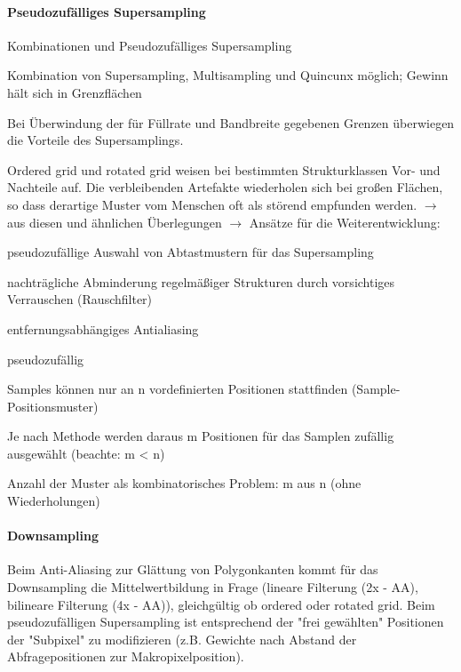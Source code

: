 \documentclass[landscape]{article}
\begin{document}
\begin{multicols}{3}
  \paragraph{Pseudozufälliges Supersampling}
  \begin{itemize*}
    \item Kombinationen und Pseudozufälliges Supersampling
          \begin{itemize*}
            \item Kombination von Supersampling, Multisampling und Quincunx möglich; Gewinn hält sich in Grenzflächen
            \item Bei Überwindung der für Füllrate und Bandbreite gegebenen Grenzen überwiegen die Vorteile des Supersamplings.
            \item Ordered grid und rotated grid weisen bei bestimmten Strukturklassen Vor- und Nachteile auf. Die verbleibenden Artefakte wiederholen sich bei großen Flächen, so dass derartige Muster vom Menschen oft als störend empfunden werden. $\rightarrow$ aus diesen und ähnlichen Überlegungen $\rightarrow$ Ansätze für die Weiterentwicklung:
            \item pseudozufällige Auswahl von Abtastmustern für das Supersampling
            \item nachträgliche Abminderung regelmäßiger Strukturen durch vorsichtiges Verrauschen (Rauschfilter)
            \item entfernungsabhängiges Antialiasing
          \end{itemize*}
    \item pseudozufällig
          \begin{itemize*}
            \item Samples können nur an n vordefinierten Positionen stattfinden (Sample-Positionsmuster)
            \item Je nach Methode werden daraus m Positionen für das Samplen zufällig ausgewählt (beachte: m < n)
            \item Anzahl der Muster als kombinatorisches Problem: m aus n (ohne Wiederholungen)
          \end{itemize*}
  \end{itemize*}
  
  \paragraph{Downsampling}
  Beim Anti-Aliasing zur Glättung von Polygonkanten kommt für das Downsampling die Mittelwertbildung in Frage (lineare Filterung (2x - AA), bilineare Filterung (4x - AA)), gleichgültig ob ordered oder rotated grid. Beim pseudozufälligen Supersampling ist entsprechend der "frei gewählten" Positionen der "Subpixel" zu modifizieren (z.B. Gewichte nach Abstand der Abfragepositionen zur Makropixelposition).
  

\end{multicols}
\end{document}
